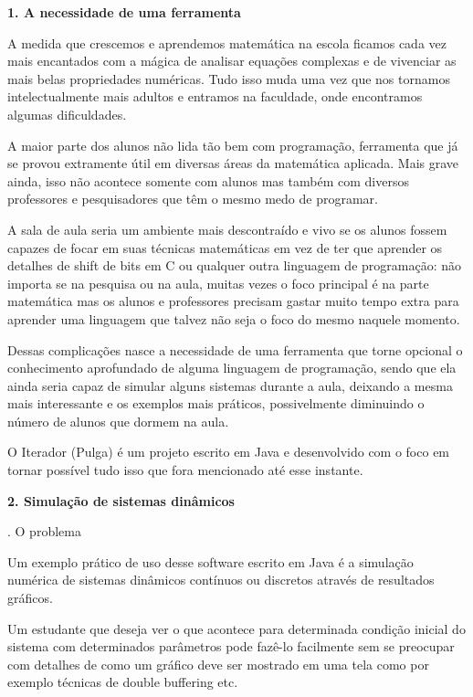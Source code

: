 \documentclass[12pt,twoside]{article}
\begin{document}
{\bfseries
1. A necessidade de uma ferramenta}

{
A medida que crescemos e aprendemos matem\'atica na escola ficamos cada
vez mais encantados com a m\'agica de analisar equa\c{c}\~oes complexas
e de vivenciar as mais belas propriedades num\'ericas. Tudo isso muda
uma vez que nos tornamos intelectualmente mais adultos e entramos na
faculdade, onde encontramos algumas dificuldades.}

{
 A maior parte dos alunos n\~ao lida t\~ao bem com programa\c{c}\~ao,
ferramenta que j\'a se provou extramente \'util em diversas \'areas da
matem\'atica aplicada. Mais grave ainda, isso n\~ao acontece somente
com alunos mas tamb\'em com diversos professores e pesquisadores que
t\^em o mesmo medo de programar.}

{
 A sala de aula seria um ambiente mais descontra\'ido e vivo se os
alunos fossem capazes de focar em suas t\'ecnicas matem\'aticas em vez
de ter que aprender os detalhes de shift de bits em C ou qualquer outra
linguagem de programa\c{c}\~ao: n\~ao importa se na pesquisa ou na
aula, muitas vezes o foco principal \'e na parte matem\'atica mas os
alunos e professores precisam gastar muito tempo extra para aprender
uma linguagem que talvez n\~ao seja o foco do mesmo naquele momento.}

{
 Dessas complica\c{c}\~oes nasce a necessidade de uma ferramenta que
torne opcional o conhecimento aprofundado de alguma linguagem de
programa\c{c}\~ao, sendo que ela ainda seria capaz de simular alguns
sistemas durante a aula, deixando a mesma mais interessante e os
exemplos mais pr\'aticos, possivelmente diminuindo o n\'umero de alunos
que dormem na aula.}

{
 O Iterador (Pulga) \'e um projeto escrito em Java e desenvolvido com o
foco em tornar poss\'ivel tudo isso que fora mencionado at\'e esse
instante.}

{\bfseries
2. Simula\c{c}\~ao de sistemas din\^amicos}

{. O problema}

{
Um exemplo pr\'atico de uso desse software escrito em Java \'e a
simula\c{c}\~ao num\'erica de sistemas din\^amicos cont\'inuos ou
discretos atrav\'es de resultados gr\'aficos.}

{
 Um estudante que deseja ver o que acontece para determinada
condi\c{c}\~ao inicial do sistema com determinados par\^ametros pode
faz\^e{}-lo facilmente sem se preocupar com detalhes de como um
gr\'afico deve ser mostrado em uma tela como por exemplo t\'ecnicas de
double buffering etc.}
\end{document}
